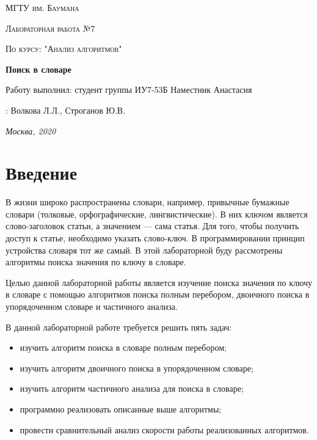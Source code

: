 \documentclass[12pt]{report}
\begin{document}
 
\begin{titlepage}
	\centering
	{\scshape\LARGE МГТУ им. Баумана \par}
	\vspace{3cm}
	{\scshape\Large Лабораторная работа №7\par}
	\vspace{0.5cm}	
	{\scshape\Large По курсу: "Анализ алгоритмов"\par}
	\vspace{1.5cm}
	{\huge\bfseries Поиск в словаре \par}
	\vspace{2cm}
	\Large Работу выполнил: студент группы ИУ7-53Б Наместник Анастасия\par
	\vspace{0.5cm}
	:  Волкова Л.Л., Строганов Ю.В.\par

	\vfill
	\large \textit {Москва, 2020} \par
\end{titlepage}

\tableofcontents

\newpage
\chapter*{Введение}

В жизни широко распространены словари, например, привычные бумажные словари (толковые, орфографические, лингвистические). В них ключом является слово-заголовок статьи, а значением — сама статья. Для того, чтобы получить доступ к статье, необходимо указать слово-ключ. В программировании принцип устройства словаря тот же самый. В этой лабораторной буду рассмотрены алгоритмы поиска значения по ключу в словаре. 
	
Целью данной лабораторной работы является изучение поиска значения по ключу в словаре с помощью алгоритмов поиска полным перебором, двоичного поиска в упорядоченном словаре и частичного анализа.

В данной лабораторной работе требуется решить пять задач:
\begin{itemize}
\item изучить алгоритм поиска в словаре полным перебором;
\item изучить алгоритм двоичного поиска в упорядоченном словаре;
\item изучить алгоритм частичного анализа для поиска в словаре;
\item программно реализовать описанные выше алгоритмы;
\item провести сравнительный анализ скорости работы реализованных алгоритмов.
\end{itemize}
\end{document}
